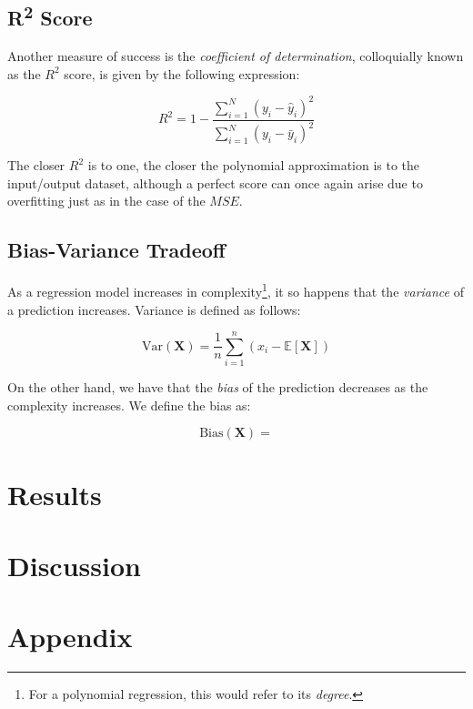 \documentclass[a4paper,10pt,english]{article}
\begin{document}
	\subsection*{R\textsuperscript{2} Score}
	
	Another measure of success is the \textit{coefficient of determination}, colloquially known as the $R^2$ score, is given by the following expression:
	
	\begin{equation}
	R^2 = 1 - \frac{\sum_{i=1}^N (y_i - \hat{y}_i)^2 }{\sum_{i=1}^N (y_i - \bar{y}_i)^2 }
	\end{equation}
	
	The closer $R^2$ is to one, the closer the polynomial approximation is to the input/output dataset, although a perfect score can once again arise due to overfitting just as in the case of the $MSE$.
	
	\subsection*{Bias-Variance Tradeoff}
	
	As a regression model increases in complexity\footnote{For a polynomial regression, this would refer to its \textit{degree}.}, it so happens that the \textit{variance} of a prediction increases.  Variance is defined as follows:
	
	\begin{equation}
	\label{eq_method_5}
	\text{Var}(\mathbf{X}) = \frac{1}{n} \sum_{i=1}^{n} (x_i - \mathbb{E}[\mathbf{X}] )
	\end{equation}
	
	On the other hand, we have that the \textit{bias} of the prediction decreases as the complexity increases.  We define the bias as:
	
	\begin{equation}
	\label{eq_method_6}
	\text{Bias}(\mathbf{X}) = 
	\end{equation}
		
\section*{Results}
\label{sec:results}

\section*{Discussion}
\label{sec:discussion}

\newpage

\section*{Appendix}
\label{sec:appendix}

{}

	
\end{document}
